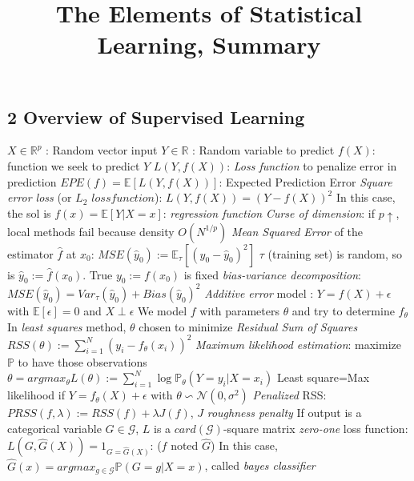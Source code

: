 \documentclass[9pt]{extarticle}
\title{The Elements of Statistical Learning, Summary}
\date{}
\begin{document}
\maketitle
\vspace{-15ex}
\begin{multicols*}{2}

\newcommand\E{\mathbb{E}}
\newcommand\Proba{\mathbb{P}}
\newcommand\R{\mathbb{R}}
\newcommand{\nl}{\newline}
\newcommand{\N}{\mathcal{N}}

\section*{2 Overview of Supervised Learning}

$X \in \mathbb{R}^p$ : Random vector input\nl
$Y \in \mathbb{R}$ : Random variable to predict\nl
$f(X)$: function we seek to predict $Y$\nl
$L(Y,f(X))$: \textit{Loss function} to penalize error in prediction\nl
$EPE(f)=\E[L(Y,f(X))]$: Expected Prediction Error\nl
\emph{Square error loss} (or \emph{$L_2$ $loss function$}): $L(Y,f(X))=(Y-f(X))^2$\nl
In this case, the sol is $f(x)=\E[Y|X=x]$: \emph{regression function}\nl
\emph{Curse of dimension}: if $p\uparrow$, local methods fail because density $O(N^{1/p})$\nl
\emph{Mean Squared Error} of the estimator $\hat{f}$ at $x_0$:
$MSE(\hat{y}_0):=\E_{\tau}[(y_0-\hat{y}_0)^2]$\nl
$\tau$ (training set) is random, so is $\hat{y}_0:=\hat{f}(x_0)$. True $y_0:=f(x_0)$ is fixed\nl
\emph{bias-variance decomposition}: $MSE(\hat{y}_0)=Var_{\tau}(\hat{y}_0)+Bias(\hat{y}_0)^2$\nl
\emph{Additive error} model : $Y=f(X)+\epsilon$ with $\E[\epsilon]=0$ and $X\perp \epsilon$\nl
We model $f$ with parameters $\theta$ and try to determine $f_{\theta}$\nl
In \emph{least squares} method, $\theta$ chosen to minimize \emph{Residual Sum of Squares}\nl
$RSS(\theta):=\sum_{i=1}^{N}(y_i-f_{\theta}(x_i))^2$\nl
\emph{Maximum likelihood estimation}: maximize $\Proba$ to have those observations\nl
$\theta=argmax_{\theta} L(\theta):=\sum_{i=1}^{N}\log \Proba_{\theta}(Y=y_i|X=x_i)$\nl
Least square=Max likelihood if $Y=f_{\theta}(X)+\epsilon$ with $\theta \backsim \N(0,\sigma^2)$\nl
\emph{Penalized} RSS: $PRSS(f,\lambda):=RSS(f)+\lambda J(f)$, $J$ \emph{roughness penalty}\nl
If output is a categorical variable $G \in \mathcal{G}$, $L$ is a $card(\mathcal{G})$-square matrix\nl
\textit{zero-one} loss function: $L(G,\hat{G}(X))=1_{G=\hat{G}(X)}$:  ($f$ noted $\hat{G}$)\nl
In this case, $\hat{G}(x)=argmax_{g \in \mathcal{G}} \Proba(G=g|X=x)$, called \textit{bayes classifier}




\end{multicols*}
\end{document}
